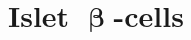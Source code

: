 












\newpage




\section{ Islet \( \mathbf{\upbeta} \)-cells}  %
\label{sec:human_ipscs}  


